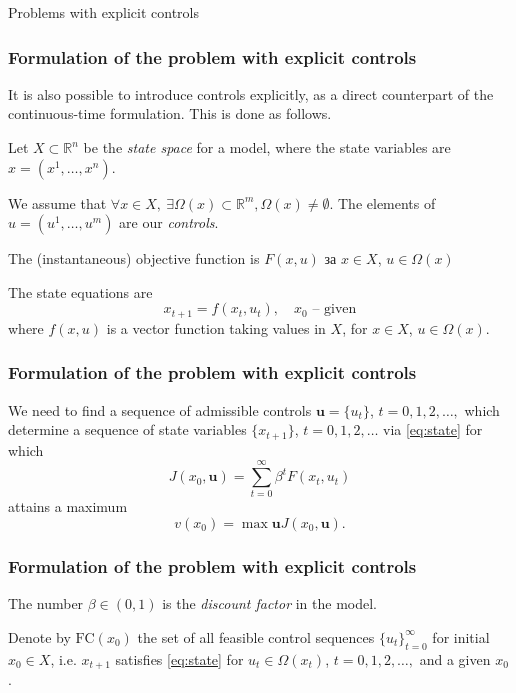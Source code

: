\documentclass[10pt]{beamer}
\theoremstyle{definition}
\begin{document}
\begin{section}{Problems with explicit controls}\label{sec:explcontr}

\begin{frame}[fragile]
\frametitle{Formulation of the problem with explicit controls}
It is also possible to introduce controls explicitly, as a direct counterpart of the continuous-time formulation. This is done as follows.\bigskip

Let $X \subset \mathbb{R}^n$ be the \emph{state space} for a model, where the state variables are $x=(x^1,\ldots,x^n)$. \bigskip

We assume that $\forall x \in X,~ \exists \Omega(x) \subset \mathbb{R}^m, \Omega(x)\neq \emptyset$. The elements of $u=(u^1,\ldots,u^m)$ are our \emph{controls}. \bigskip

The (instantaneous) objective function is $F(x,u)$ за $x \in X$, $u \in \Omega(x)$ \bigskip

The state equations are
\begin{equation}
x_{t+1}=f(x_t,u_t),\quad x_0 \text{ -- given} \label{eq:state}
\end{equation}
where $f(x,u)$ is a vector function taking values in $X$, for $x \in X$, $u \in \Omega(x)$.\bigskip
\end{frame}



\begin{frame}[fragile]
\frametitle{Formulation of the problem with explicit controls}

We need to find a sequence of admissible controls $\mathbf{u} = \{u_t\}$, $t=0,1,2,\ldots,$
which determine a sequence of state variables $\{ x_{t+1} \}$, $t=0,1,2,\ldots$ via \eqref{eq:state} for which \begin{equation}
J(x_0,\mathbf{u})=\sum_{t=0}^\infty
\beta^t F(x_t,u_t)\label{eq:obj}
\end{equation} attains a maximum \begin{equation}
v(x_0)=\max {\mathbf{u}} J(x_0,\mathbf{u}).  
\label{eq:objMax}
\end{equation} 
\end{frame}



\begin{frame}[fragile]
\frametitle{Formulation of the problem with explicit controls}
The number $\beta \in (0,1)$ is the \emph{discount factor} in the model. \bigskip

Denote by $\textrm{FC}(x_0)$ the set of all feasible control sequences $\{ u_t\}_{t=0}^\infty$ for initial $x_0 \in X$, i.e. $ x_{t+1} $
satisfies \eqref{eq:state} for $ u_t \in \Omega(x_t)$, $t=0,1,2,\ldots,$
and a given $x_0$. \bigskip


\end{frame}
\end{section}
\end{document}
